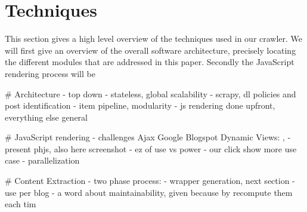 \section{Techniques}

This section gives a high level overview of the techniques used in our crawler. We will first give an overview of the overall software architecture, precisely locating the different modules that are addressed in this paper. Secondly the JavaScript rendering process will be 

# Architecture
- top down
- stateless, global scalability
- scrapy, dl policies and post identification
- item pipeline, modularity
- js rendering done upfront, everything else general

# JavaScript rendering
- challenges
Ajax
Google Blogspot Dynamic Views: , 
- present phjs, also here screenshot
- ez of use vs power
- our click show more use case
- parallelization

# Content Extraction
- two phase process:
- wrapper generation, next section
- use per blog
- a word about maintainability, given because by recompute them each tim
